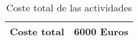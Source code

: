 \begin{table}[h]
    \centering
    \begin{tabular}{|c|c|}
    \hline
    Coste total & 6000 Euros \\ \hline
    \end{tabular}
    \caption {Coste total de las actividades}
\end{table}